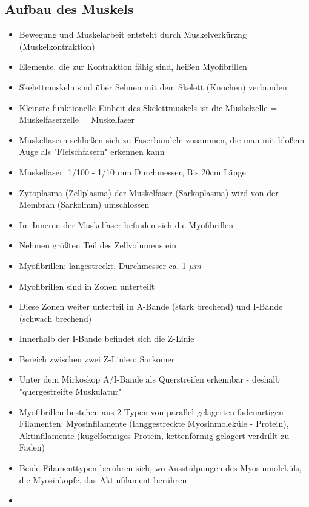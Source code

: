 \documentclass[a4paper,10pt,oneside]{article}
\begin{document}
\subsection{Aufbau des Muskels}
	\begin{itemize}
		\item Bewegung und Muskelarbeit entsteht durch Muskelverkürzng (Muskelkontraktion)
		\item Elemente, die zur Kontraktion fähig sind, heißen Myofibrillen
		\item Skelettmuskeln sind über Sehnen mit dem Skelett (Knochen) verbunden
		\item Kleinste funktionelle Einheit des Skelettmuskels ist die Muskelzelle = Muskelfaserzelle = Muskelfaser 
		\item Muskelfasern schließen sich zu Faserbündeln zusammen, die man mit bloßem Auge als "Fleischfasern" erkennen kann
		\item Muskelfaser: 1/100 - 1/10 mm Durchmesser, Bis 20cm Länge
		\item Zytoplasma (Zellplasma) der Muskelfaser (Sarkoplasma) wird von der Membran (Sarkolmm) umschlossen
		\item Im Inneren der Muskelfaser befinden sich die Myofibrillen
		\item Nehmen größten Teil des Zellvolumens ein
		\item Myofibrillen: langestreckt, Durchmesser ca. 1 $\mu m$
		\item Myofibrillen sind in Zonen unterteilt
		\item Diese Zonen weiter unterteil in A-Bande (stark brechend) und I-Bande (schwach brechend)
		\item Innerhalb der I-Bande befindet sich die Z-Linie
		\item Bereich zwischen zwei Z-Linien: Sarkomer
		\item Unter dem Mirkoskop A/I-Bande als Querstreifen erkennbar - deshalb "quergestreifte Muskulatur"
		\item Myofibrillen bestehen aus 2 Typen von parallel gelagerten fadenartigen Filamenten: Myosinfilamente (langgestreckte Myosinmoleküle - Protein), Aktinfilamente (kugelförmiges Protein, kettenförmig gelagert verdrillt zu Faden)
		\item Beide Filamenttypen berühren sich, wo Ausstülpungen des Myosinmoleküls, die Myosinköpfe, das Aktinfilament berühren
		\item[] %
		
	\end{itemize}
\end{document}
